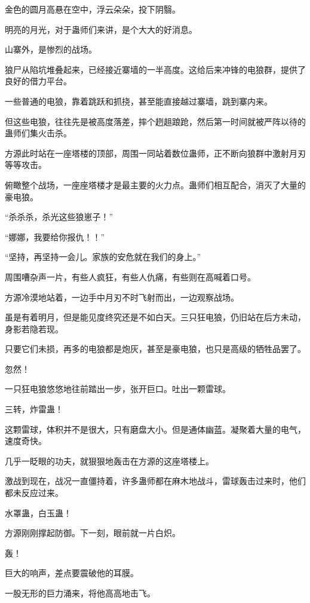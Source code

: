 
\begin{this_body}

金色的圆月高悬在空中，浮云朵朵，投下阴翳。

明亮的月光，对于蛊师们来讲，是个大大的好消息。

山寨外，是惨烈的战场。

狼尸从陷坑堆叠起来，已经接近寨墙的一半高度。这给后来冲锋的电狼群，提供了良好的借力平台。

一些普通的电狼，靠着跳跃和抓挠，甚至能直接越过寨墙，跳到寨内来。

但这些电狼，往往先是被高度落差，摔个趔趄踉跄，然后第一时间就被严阵以待的蛊师们集火击杀。

方源此时站在一座塔楼的顶部，周围一同站着数位蛊师，正不断向狼群中激射月刃等等攻击。

俯瞰整个战场，一座座塔楼才是最主要的火力点。蛊师们相互配合，消灭了大量的豪电狼。

“杀杀杀，杀光这些狼崽子！”

“娜娜，我要给你报仇！！”

“坚持，再坚持一会儿。家族的安危就在我们的身上。”

周围嘈杂声一片，有些人疯狂，有些人仇痛，有些则在高喊着口号。

方源冷漠地站着，一边手中月刃不时飞射而出，一边观察战场。

虽是有着明月，但是能见度终究还是不如白天。三只狂电狼，仍旧站在后方未动，身影若隐若现。

只要它们未损，再多的电狼都是炮灰，甚至是豪电狼，也只是高级的牺牲品罢了。

忽然！

一只狂电狼悠悠地往前踏出一步，张开巨口。吐出一颗雷球。

三转，炸雷蛊！

这颗雷球，体积并不是很大，只有磨盘大小。但是通体幽蓝。凝聚着大量的电气，速度奇快。

几乎一眨眼的功夫，就狠狠地轰击在方源的这座塔楼上。

激战到现在，战况一直僵持着，许多蛊师都在麻木地战斗，雷球轰击过来时，他们都未反应过来。

水罩蛊，白玉蛊！

方源刚刚撑起防御。下一刻，眼前就一片白炽。

轰！

巨大的响声，差点要震破他的耳膜。

一股无形的巨力涌来，将他高高地击飞。


\end{this_body}
